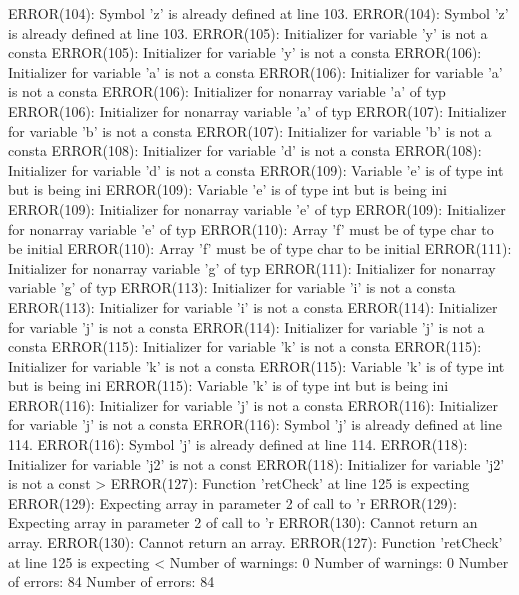 \documentclass[12pt]{book}
\begin{document}
ERROR(104): Symbol 'z' is already defined at line 103.                ERROR(104): Symbol 'z' is already defined at line 103.
ERROR(105): Initializer for variable 'y' is not a consta        ERROR(105): Initializer for variable 'y' is not a consta
ERROR(106): Initializer for variable 'a' is not a consta        ERROR(106): Initializer for variable 'a' is not a consta
ERROR(106): Initializer for nonarray variable 'a' of typ        ERROR(106): Initializer for nonarray variable 'a' of typ
ERROR(107): Initializer for variable 'b' is not a consta        ERROR(107): Initializer for variable 'b' is not a consta
ERROR(108): Initializer for variable 'd' is not a consta        ERROR(108): Initializer for variable 'd' is not a consta
ERROR(109): Variable 'e' is of type int but is being ini        ERROR(109): Variable 'e' is of type int but is being ini
ERROR(109): Initializer for nonarray variable 'e' of typ        ERROR(109): Initializer for nonarray variable 'e' of typ
ERROR(110): Array 'f' must be of type char to be initial        ERROR(110): Array 'f' must be of type char to be initial
ERROR(111): Initializer for nonarray variable 'g' of typ        ERROR(111): Initializer for nonarray variable 'g' of typ
ERROR(113): Initializer for variable 'i' is not a consta        ERROR(113): Initializer for variable 'i' is not a consta
ERROR(114): Initializer for variable 'j' is not a consta        ERROR(114): Initializer for variable 'j' is not a consta
ERROR(115): Initializer for variable 'k' is not a consta        ERROR(115): Initializer for variable 'k' is not a consta
ERROR(115): Variable 'k' is of type int but is being ini        ERROR(115): Variable 'k' is of type int but is being ini
ERROR(116): Initializer for variable 'j' is not a consta        ERROR(116): Initializer for variable 'j' is not a consta
ERROR(116): Symbol 'j' is already defined at line 114.                ERROR(116): Symbol 'j' is already defined at line 114.
ERROR(118): Initializer for variable 'j2' is not a const        ERROR(118): Initializer for variable 'j2' is not a const
                                                           >        ERROR(127): Function 'retCheck' at line 125 is expecting
ERROR(129): Expecting array in parameter 2 of call to 'r        ERROR(129): Expecting array in parameter 2 of call to 'r
ERROR(130): Cannot return an array.                                ERROR(130): Cannot return an array.
ERROR(127): Function 'retCheck' at line 125 is expecting   <
Number of warnings: 0                                                Number of warnings: 0
Number of errors: 84                                                Number of errors: 84
\end{document}

